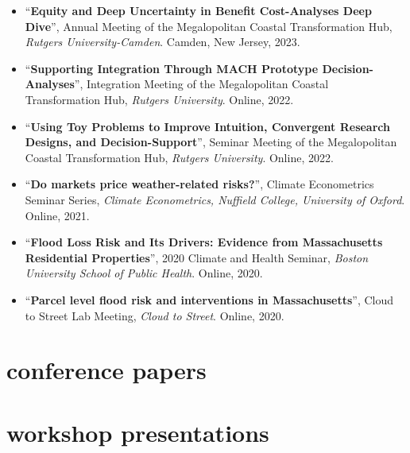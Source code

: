 \documentclass[10pt,oneside]{article}
\begin{document}
\begin{itemize}[label={}]
  \item \enquote{\textbf{Equity and Deep Uncertainty in Benefit Cost-Analyses Deep Dive}}, Annual Meeting of the Megalopolitan Coastal Transformation Hub,  \textit{Rutgers University-Camden}. Camden, New Jersey, 2023.
  
  \item \enquote{\textbf{Supporting Integration Through MACH Prototype Decision-Analyses}}, Integration Meeting of the Megalopolitan Coastal Transformation Hub,  \textit{Rutgers University}. Online, 2022.
  
  \item \enquote{\textbf{Using Toy Problems to Improve Intuition, Convergent Research Designs, and Decision-Support}}, Seminar Meeting of the Megalopolitan Coastal Transformation Hub,  \textit{Rutgers University}. Online, 2022.
  
  \item \enquote{\textbf{Do markets price weather-related risks?}}, Climate Econometrics Seminar Series,  \textit{Climate Econometrics, Nuffield College, University of Oxford}. Online, 2021.
  
  \item \enquote{\textbf{Flood Loss Risk and Its Drivers: Evidence from Massachusetts Residential Properties}}, 2020 Climate and Health Seminar,  \textit{Boston University School of Public Health}. Online, 2020.
  
  \item \enquote{\textbf{Parcel level flood risk and interventions in Massachusetts}}, Cloud to Street Lab Meeting,  \textit{Cloud to Street}. Online, 2020.
  
\end{itemize}

\section{conference papers}

\mbox{}\vspace{-\dimexpr\baselineskip\relax}
\vspace*{-1em}
\printbibliography[type=inproceedings, heading=none]


\section{workshop presentations}

\mbox{}\vspace{-\dimexpr\baselineskip\relax}
\end{document}
